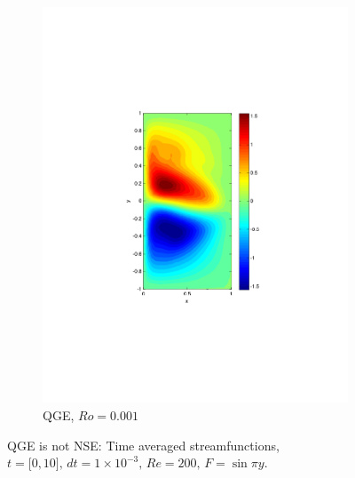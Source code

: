 \begin{figure}
\begin{center}
\begin{subfigure}{0.3\textwidth}
    \includegraphics[scale=0.5]{Figures/Re200Ro1E-3h16k1000}
    \caption{QGE, $Ro=0.001$}
    \label{sfi:QGERo0.001}
  \end{subfigure}
  \caption{QGE is not NSE: Time averaged streamfunctions, $t=\lbrack 0,
    10\rbrack,\, dt=1\times 10^{-3},\, Re= 200,\, F = \sin \pi y$.}
  \label{fig:NSEnotQGE}
  \end{center}
\end{figure}

